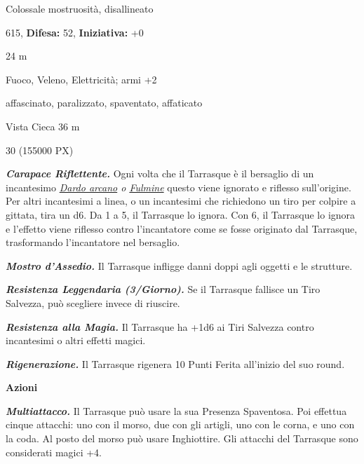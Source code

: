 \begin{multicols}{2}
{
\noindent
\begin{description}[noitemsep, topsep=0pt, parsep=0pt, partopsep=0pt, leftmargin=0cm, labelwidth=2.2cm]
	\item[\textbf{Taglia/Tipo:}] Colossale mostruosità, disallineato
	\item[\textbf{Caratt.:}] 
	\item[\textbf{Punti Ferita:}] 615,  \textbf{Difesa:} 52,  \textbf{Iniziativa:} +0
	\item[\textbf{Movimento:}] 24 m
	\item[\textbf{Tiri Salvez.:}] 
	\item[\textbf{Imm. Danni:}] Fuoco, Veleno, Elettricità; armi +2
	\item[\textbf{Immunità:}] affascinato, paralizzato, spaventato, affaticato
	\item[\textbf{Sensi:}] Vista Cieca 36 m
	\item[\textbf{Sfida:}] 30 (155000 PX)\smallskip
\end{description}

\emph{\textbf{Carapace Riflettente.}} Ogni volta che il Tarrasque è il bersaglio di un incantesimo \emph{\hyperlink{Dardo arcano}{Dardo arcano} o \hyperlink{Fulmine}{Fulmine}} questo viene ignorato e riflesso sull'origine. Per altri incantesimi a linea, o un incantesimi che richiedono un tiro per colpire a gittata, tira un d6. Da 1 a 5, il Tarrasque lo ignora. Con 6, il Tarrasque lo ignora e l'effetto viene riflesso contro l'incantatore come se fosse originato dal Tarrasque, trasformando l'incantatore nel bersaglio.

\emph{\textbf{Mostro d'Assedio.}} Il Tarrasque infligge danni doppi agli oggetti e le strutture.

\emph{\textbf{Resistenza Leggendaria (3/Giorno).}} Se il Tarrasque fallisce un Tiro Salvezza, può scegliere invece di riuscire.

\emph{\textbf{Resistenza alla Magia.}} Il Tarrasque ha +1d6 ai Tiri Salvezza contro incantesimi o altri effetti magici.

\emph{\textbf{Rigenerazione.}} Il Tarrasque rigenera 10 Punti Ferita all'inizio del suo round.

\textbf{Azioni}

\emph{\textbf{Multiattacco.}} Il Tarrasque può usare la sua Presenza Spaventosa. Poi effettua cinque attacchi: uno con il morso, due con gli artigli, uno con le corna, e uno con la coda. Al posto del morso può usare Inghiottire. Gli attacchi del Tarrasque sono considerati magici +4.

}
\end{multicols}
